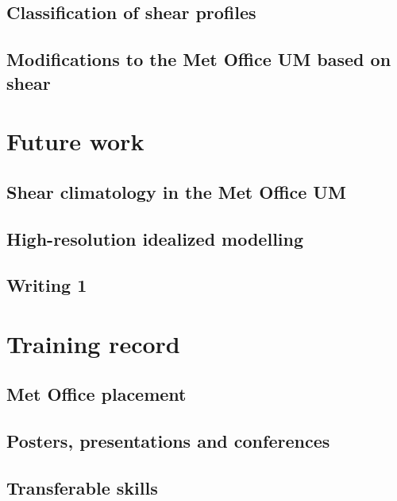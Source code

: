 \documentclass[11pt,a4paper]{article}
\begin{document}
\subsection{Classification of shear profiles}
\label{sec:Classification of shear profiles}

\subsection{Modifications to the Met Office UM based on shear}
\label{sec:um_mod}

\section{Future work}
\label{sec:Future work}

\subsection{Shear climatology in the Met Office UM}
\label{sec:Shear climatology in the Met Office UM}

\subsection{High-resolution idealized modelling}
\label{sec:High-resolution idealized modelling}

\subsection{Writing 1}
\label{sec:Writing 1}

\section{Training record}
\label{sec:Training record}

\subsection{Met Office placement}
\label{sec:Met Office placement}

\subsection{Posters, presentations and conferences}
\label{sec:presentations}

\subsection{Transferable skills}
\label{sec:Transferable skills}
\end{document}
